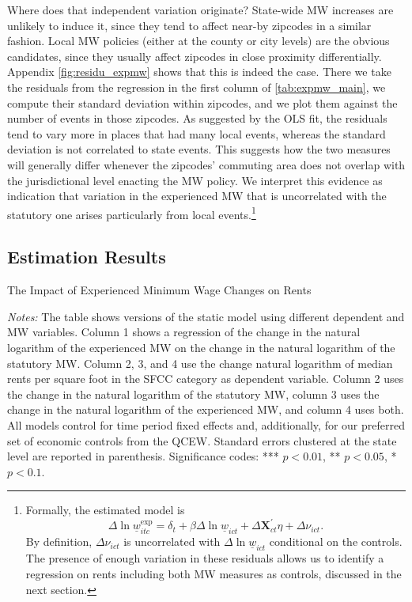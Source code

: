 Where does that independent 
variation originate? State-wide MW increases are unlikely to induce it, since they tend to 
affect near-by zipcodes in a similar fashion. Local MW policies (either at the county or city
levels) are the obvious candidates, since they usually affect zipcodes in close proximity 
differentially. Appendix \autoref{fig:residu_expmw} shows that this is indeed the case. 
There we take the residuals from the regression in the first column of 
\autoref{tab:expmw_main}, we compute their standard deviation within zipcodes, and we plot 
them against the number of events in those zipcodes. As suggested by the OLS fit, the residuals
tend to vary more in places that had many local events, whereas the standard deviation is not 
correlated to state events. This suggests how the two measures will generally differ whenever the 
zipcodes' commuting area does not overlap with the jurisdictional level enacting the MW 
policy. We interpret this evidence as indication that variation in the 
experienced MW that is uncorrelated with the statutory one arises particularly from local 
events.\footnote{Formally, the estimated model is 
	$$ \Delta \ln \underline{w}_{itc}^{\text{exp}} = \delta_t 
				+ \beta \Delta \ln \underline{w}_{ict} + \Delta \mathbf{X}^{'}_{ct} \eta 
				+ \Delta \nu_{ict} . $$
	By definition, $\Delta \nu_{ict}$ is uncorrelated with $\Delta \ln \underline{w}_{ict}$ 
	conditional on the controls. The presence of enough variation in these residuals allows us
	to identify a regression on rents including both MW measures as controls, discussed in the
	next section.}


\subsection{Estimation Results}
\begin{table}[htb!]\centering
	\caption{The Impact of Experienced Minimum Wage Changes on Rents}
	\label{tab:expmw_main}
	
	\begin{minipage}{0.95\textwidth}\footnotesize
		\vspace{3mm}	
		\textit{Notes:} The table shows versions of the static model using different 
		dependent and MW variables. Column 1 shows a regression of the change in the natural 
		logarithm of the experienced MW on the change in the natural logarithm of the 
		statutory MW. Column 2, 3, and 4 use the change natural logarithm of median rents per 
		square foot in the SFCC category as dependent variable. Column 2 uses the change in 
		the natural logarithm of the statutory MW, column 3 uses the change in the natural 
		logarithm of the experienced MW, and column 4 uses both. All models control for time 
		period fixed effects and, additionally, for our preferred set of economic controls 
		from the QCEW. 
		Standard errors clustered at the state level are reported in parenthesis. Significance 
		codes: *** $p < 0.01$, ** $p < 0.05$, * $p < 0.1$.
	\end{minipage}
\end{table}

